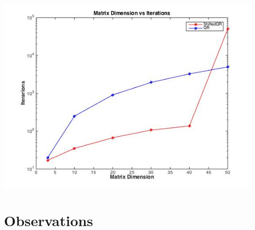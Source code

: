 \documentclass[12pt,a4paper]{article}
\begin{document}
\includegraphics[scale =0.7]{./semiiter.jpg}\\
\section{Observations}
\end{document}
